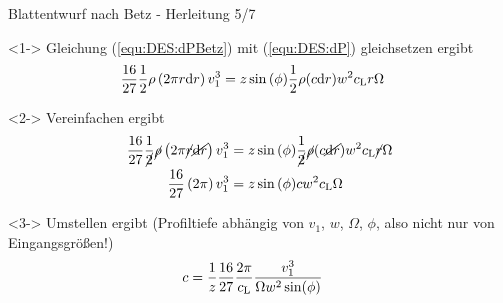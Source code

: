 \begin{frame}{Blattentwurf nach Betz - Herleitung 5/7} 
\begin{block}<1->{}
	Gleichung (\ref{equ:DES:dPBetz}) mit (\ref{equ:DES:dP}) gleichsetzen ergibt
	\begin{align*}
	\frac{16}{27} \frac{1}{2}\rho \left( 2\pi r \textnormal{d}r \right) v_1^3 & = z \sin{(\phi)} \frac{1}{2} \rho ( c \textnormal{d} r ) w^2 c_{\textnormal{L}} r \Omega 
	\end{align*}		
\end{block}		
\begin{block}<2->{}
	Vereinfachen ergibt
	\begin{align*}			
	\frac{16}{27} \frac{1}{\cancel{2}} \cancel{\rho} \left( 2\pi \cancel{r} \cancel{\textnormal{d}r} \right) v_1^3 & = z \sin{(\phi)} \frac{1}{\cancel{2}} \cancel{\rho} ( c \cancel{\textnormal{d}r} ) w^2 c_{\textnormal{L}}\cancel{r} \Omega \\
	\frac{16}{27}  \left( 2\pi \right) v_1^3 & = z \sin{(\phi)}  c   w^2 c_{\textnormal{L}} \Omega
	\end{align*}			
\end{block}	
\begin{block}<3->{}
	Umstellen ergibt (Profiltiefe abhängig von $v_1$, $w$, $\Omega$, $\phi$, also nicht nur von Eingangsgrößen!)
	\begin{align}			
	c   & = \frac{1}{z} \frac{16}{27} \frac{2\pi}{c_{\textnormal{L}}} \frac{v_1^3}{\Omega w^2 \sin(\phi)} \label{equ:DES:c}
	\end{align}			
\end{block}	
\end{frame}
